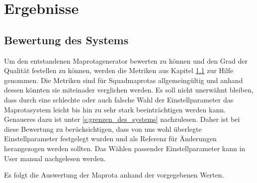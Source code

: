 \section{Ergebnisse}
    \subsection{Bewertung des Systems}
        Um den entstandenen Maprotagenerator bewerten zu können und den Grad der Qualität festellen zu können, 
        werden die Metriken aus Kapitel \ref{}  zur Hilfe genommen. Die Metriken sind für Squadmaprotas
        allgemeingültig und anhand dessen könnten sie miteinader verglichen werden. Es soll nicht unerwähnt bleiben,
        dass durch eine schlechte oder auch falsche Wahl der Einstellparameter das Maprotasystem leicht bis hin zu 
        sehr stark beeinträchtigen werden kann. Genaueres dazu ist unter \ref{s:grenzen_des_systems} nachzulesen.
        Daher ist bei diese Bewertung zu berücksichtigen, dass von uns wohl überlegte Einstellparameter festgelegt wurden
        und als Referenz für Änderungen herangezogen werden sollten.
        Das Wählen passender Einstellparameter kann in User manual nachgelesen werden.
   
        Es folgt die Auswertung der Maprota anhand der vorgegebenen Werten.\\

